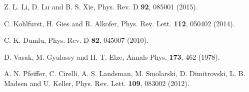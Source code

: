 \documentclass[aps,preprint,superscriptaddress]{revtex4}
\begin{document}
\begin{thebibliography}{99}
Z. L. Li, D. Lu and B. S. Xie,
Phys. Rev. D {\textbf {92}}, 085001 (2015).
%

C. Kohlfurst, H. Gies and R. Alkofer, Phys. Rev. Lett. {\textbf{112}},
050402 (2014).
%


C. K. Dumlu,
Phys. Rev. D {\textbf{82}}, 045007 (2010).
%


D. Vasak, M. Gyulassy and H. T. Elze, Annals Phys. {\textbf{173}}, 462 (1978).
%

A. N. Pfeiffer, C. Cirelli, A. S. Landsman, M. Smolarski, D. Dimitrovski, L. B. Madsen and U. Keller,
Phys. Rev. Lett. {\textbf{109}}, 083002 (2012).


\end{thebibliography}
\end{document}
